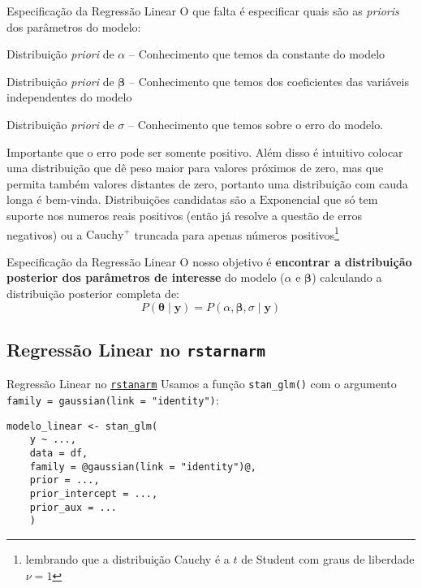 \begin{frame}{Especificação da Regressão Linear}
    O que falta é especificar quais são as \textit{prioris} dos parâmetros do modelo:
    \begin{vfilleditems}
        \item Distribuição \textit{priori} de $\alpha$ -- Conhecimento que temos da constante do modelo
        \item Distribuição \textit{priori} de $\boldsymbol{\beta}$ -- Conhecimento que temos dos coeficientes das variáveis independentes do modelo
        \item Distribuição \textit{priori} de $\sigma$ -- Conhecimento que temos sobre o erro do modelo.
    \end{vfilleditems}
    \vfill
    \footnotesize
    Importante que o erro pode ser somente positivo. Além disso é intuitivo colocar uma
    distribuição que dê peso maior para valores próximos de zero, mas que permita
    também valores distantes de zero, portanto uma distribuição com cauda longa é
    bem-vinda. Distribuições candidatas são a $\text{Exponencial}$ que só tem
    suporte nos numeros reais positivos (então já resolve a questão de erros negativos)
    ou a $\text{Cauchy}^+$ truncada para apenas números positivos\footnote{lembrando
    que a distribuição Cauchy é a $t$ de Student com graus de liberdade $\nu = 1$}
\end{frame}

\begin{frame}{Especificação da Regressão Linear}
    O nosso objetivo é \textbf{encontrar a distribuição posterior dos parâmetros de
    interesse} do modelo ($\alpha$ e $\boldsymbol{\beta}$) calculando a distribuição
    posterior completa de:
    $$
    P(\boldsymbol{\theta} \mid \boldsymbol{y}) = P(\alpha, \boldsymbol{\beta}, \sigma \mid \boldsymbol{y})
    $$
\end{frame}

\subsection{Regressão Linear no \texttt{rstarnarm}}
\begin{frame}[fragile]{Regressão Linear no \href{http://mc-stan.org/rstanarm/}{\texttt{rstanarm}}}
    Usamos a função \texttt{stan\_glm()} com o argumento \texttt{family = gaussian(link = "identity")}:
    \vfill
    \begin{lstlisting}[basicstyle=\small]
    modelo_linear <- stan_glm(
    y ~ ...,
    data = df,
    family = @gaussian(link = "identity")@,
    prior = ...,
    prior_intercept = ...,
    prior_aux = ...
    )
    \end{lstlisting}
\end{frame}

